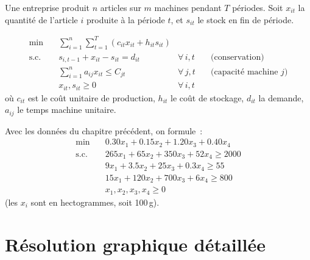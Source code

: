 \begin{exemple}
Une entreprise produit $n$ articles sur $m$ machines pendant $T$ p\'eriodes.
Soit $x_{it}$ la quantit\'e de l'article $i$ produite \`a la p\'eriode $t$, et
$s_{it}$ le stock en fin de p\'eriode.

\[
\begin{aligned}
  \min \quad & \sum_{i=1}^{n}\sum_{t=1}^{T}
    (c_{it} x_{it} + h_{it} s_{it}) \\
  \text{s.c.} \quad
    & s_{i,t-1} + x_{it} - s_{it} = d_{it}
      & \forall\, i,t & \quad \text{(conservation)} \\
    & \sum_{i=1}^{n} a_{ij} x_{it} \le C_{jt}
      & \forall\, j,t & \quad \text{(capacit\'e machine $j$)} \\
    & x_{it}, s_{it} \ge 0 & \forall\, i,t
\end{aligned}
\]
o\`u $c_{it}$ est le co\^ut unitaire de production, $h_{it}$ le co\^ut de
stockage, $d_{it}$ la demande, $a_{ij}$ le temps machine unitaire.
\end{exemple}

\begin{exemple}
\label{ex:regime}
Avec les donn\'ees du chapitre pr\'ec\'edent, on formule~:
\[
\begin{aligned}
  \min \quad & 0.30 x_1 + 0.15 x_2 + 1.20 x_3 + 0.40 x_4 \\
  \text{s.c.} \quad
    & 265 x_1 + 65 x_2 + 350 x_3 + 52 x_4 \ge 2000 \\
    & 9 x_1 + 3.5 x_2 + 25 x_3 + 0.3 x_4 \ge 55 \\
    & 15 x_1 + 120 x_2 + 700 x_3 + 6 x_4 \ge 800 \\
    & x_1, x_2, x_3, x_4 \ge 0
\end{aligned}
\]
(les $x_i$ sont en hectogrammes, soit 100\,g).
\end{exemple}

\section{R\'esolution graphique d\'etaill\'ee}

